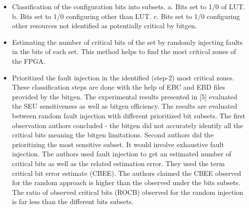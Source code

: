 \begin{itemize}

\item   {Classification of the configuration bits into subsets.
        a.  Bits set to 1/0 of LUT.
        b. Bits set to 1/0 configuring other than LUT.
        c. Bits set to 1/0 configuring other resources not identified as  potentially critical by bitgen.}
        
        
\item  {Estimating the number of critical bits of the set by randomly injecting faults in the bits of each set. This method helps to find the most critical zones of the FPGA.}

\item {Prioritized the fault injection in the identified (step-2) most critical zones.
These classification steps are done with the help of EBC and EBD files provided by the bitgen. The experimental results presented in [5] evaluated the SEU sensitiveness as well as bitgen efficiency. The results are evaluated between random fault injection with different prioritized bit subsets.  The first observation authors concluded - the bitgen did not accurately identify all the critical bits meaning the bitgen limitations. Second authors did the prioritizing the most sensitive subset. It would involve exhaustive fault injection. The authors used fault injection to get an estimated number of critical bits as well as the related estimation error. They used the term critical bit error estimate (CBEE). The authors claimed the CBEE observed for the random approach is higher than the observed under the bits subsets.  The ratio of observed critical bits (ROCB) observed for the random injection is far less than the different bits subsets.}



\end{itemize}



